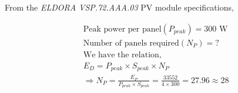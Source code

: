 \documentclass{home_assignment}
\begin{document}
From the \textit{ELDORA VSP.72.AAA.03} PV module specifications,
\begin{fleqn}[\parindent]
    \begin{equation*}
       \begin{split}
        &\text{Peak power per panel} (P_{peak})= 300 \text{ W}\\
        &\text{Number of panels required} (N_P)= \text{?}\\
        &\text{We have the relation,}\\
        &E_{D}=P_{peak}\times S_{peak}\times N_P\\
        &\Rightarrow N_P=\frac{E_P}{P_{peak}\times S_{peak}}=\frac{33552}{4\times 300}=27.96\approx 28
         \end{split}
       \end{equation*}
      \end{fleqn}
\end{document}
